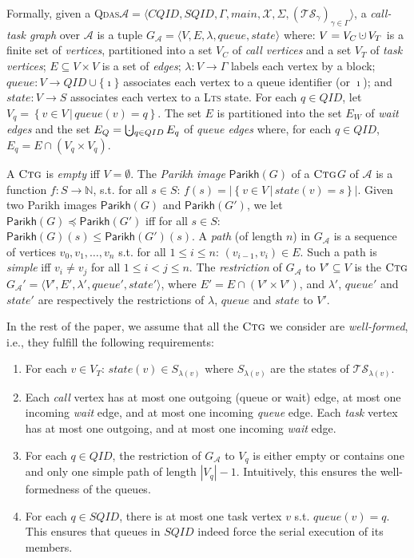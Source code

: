 \documentclass[runningheads,oribibl,]{article}
\newcommand{\mleq}{\preceq}
\newcommand{\tuple}[1]{\langle#1\rangle\xspace}
\newcommand{\set}[2]{\left\{#1\,\vert\,#2\right\}}
\newcommand{\Aa}{\ensuremath{\mathcal{A}}\xspace}
\newcommand{\Ts}{\ensuremath{\mathcal{TS}}\xspace}
\newcommand{\Xx}{\ensuremath{\mathcal{X}}\xspace}
\newcommand{\NN}{\ensuremath{\mathbb{N}}\xspace}
\DeclareMathOperator{\dotcup}{\mathaccent\cdot\cup}
\DeclareMathOperator{\bigdotcup}{\ooalign{$\bigcup$\cr\hfill$\cdot$\hfill}}
\newcommand{\CQID}{CQID\xspace}
\newcommand{\SQID}{SQID\xspace}
\newcommand{\QID}{QID\xspace}
\newcommand{\lts}{\textsc{Lts}\xspace}
\newcommand{\qdas}{\textsc{Qdas}\xspace}
\newcommand{\Graph}{\ensuremath{G}}
\newcommand{\queue}{\ensuremath{\textit{queue}}}
\newcommand{\state}{\ensuremath{\textit{state}}}
\newcommand{\ctg}{\ensuremath{\textsc{Ctg}}\xspace}
\newcommand{\Parikh}{\ensuremath{\mathsf{Parikh}}}
\begin{document}
  Formally, given a \qdas $\Aa=\tuple{ \CQID, \SQID, \Gamma, main,
    \Xx, \Sigma, (\Ts_\gamma)_{\gamma\in\Gamma}}$, a \emph{call-task
    graph} over $\Aa$ is a tuple
  $\Graph_\Aa=\tuple{V,E,\lambda,\queue,\state}$ where: $V=V_C\dotcup
  V_T$ is a finite set of \emph{vertices}, partitioned into a set
  $V_C$ of \emph{call vertices} and a set $V_T$ of \emph{task
    vertices}; $E\subseteq V\times V$ is a set of \emph{edges};
  $\lambda: V\rightarrow \Gamma$ labels each vertex by a block;
  $\queue: V\rightarrow \QID\cup\{\imath\}$ associates each vertex to
  a queue  identifier
  (or $\imath$); and $\state: V\rightarrow S$ associates each vertex
  to a \lts state.
  For each $q\in\QID$, let $V_q=\set{v\in V}{\queue(v)=q}$. The set
  $E$ is partitioned into the set $E_W$ of \emph{wait edges} and the
  set $E_Q=\bigdotcup_{q\in\QID} E_q$ of \emph{queue edges} where, for
  each $q\in\QID$, $E_q=E\cap (V_q\times V_q)$.

A \ctg is \emph{empty} iff $V=\emptyset$. The \emph{Parikh image}
$\Parikh(\Graph)$ of a \ctg $\Graph$ of $\Aa$ is a function
$f:S\rightarrow \NN$, s.t. for all $s\in S$: $f(s)=|\set{v\in
  V}{\state(v)=s}|$. Given two Parikh images $\Parikh(G)$ and
$\Parikh(G')$, we let $\Parikh(G)\mleq\Parikh(G')$ iff for all $s\in
S$: $\Parikh(G)(s)\leq\Parikh(G')(s)$.
A \emph{path} (of length $n$) in $\Graph_\Aa$ is a sequence of
vertices $v_0,v_1,\ldots, v_n$ s.t. for all $1\leq i\leq n$:
$(v_{i-1},v_i)\in E$. Such a path is \emph{simple} iff $v_i\neq v_j$
for all $1\leq i<j\leq n$. The \emph{restriction} of $\Graph_\Aa$ to
$V'\subseteq V$ is the \ctg $\Graph_\Aa'=\tuple{V', E',\lambda',
  \queue', \state'}$, where $E'=E\cap (V'\times V')$, and $\lambda'$,
$\queue'$ and $\state'$ are respectively the restrictions of
$\lambda$, $\queue$ and $\state$ to $V'$.

In the rest of the paper, we  assume that all the \ctg we
consider are \emph{well-formed}, i.e., they fulfill the following
requirements:
\begin{enumerate}
  \item For each $v\in V_T$: $\state(v)\in S_{\lambda(v)}$
    where $S_{\lambda(v)}$ are the states of $\Ts_{\lambda(v)}$.
\item Each \emph{call} vertex has at most one outgoing (queue or wait)
  edge, at most one incoming \emph{wait} edge, and at most one
  incoming \emph{queue} edge. Each \emph{task} vertex has at most one
  outgoing, and at most one incoming \emph{wait} edge.
\item For each $q\in \QID$, the restriction of $\Graph_\Aa$ to $V_q$
  is either empty or contains one and only one simple path of length
  $|V_q|-1$. Intuitively, this ensures the well-formedness of the
  queues.
\item For each $q\in \SQID$, there is at most one task vertex $v$
  s.t. $\queue(v)=q$. This ensures that queues in $\SQID$ indeed
  force the serial execution of its members.
\end{enumerate}
\end{document}
